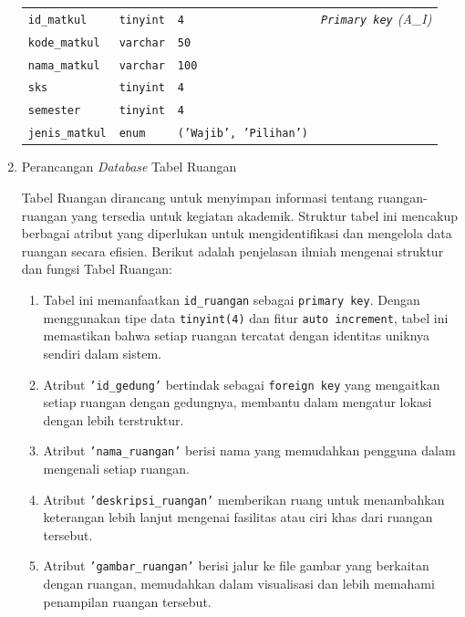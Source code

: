 \begin{enumerate}
{\begin{longtable}{p{3 cm} p{3cm} p{3 cm} p{3.4 cm}}
				      \texttt{id\_matkul}     & \texttt{tinyint}       & \texttt{4}                    & \textit{\texttt{Primary key} (A\_I)} \\
				      \texttt{kode\_matkul}   & \texttt{varchar}       & \texttt{50}                   &                                      \\
				      \texttt{nama\_matkul}   & \texttt{varchar}       & \texttt{100}                  &                                      \\
				      \texttt{sks}            & \texttt{tinyint}       & \texttt{4}                    &                                      \\
				      \texttt{semester}       & \texttt{tinyint}       & \texttt{4}                    &                                      \\
				      \texttt{jenis\_matkul}  & \texttt{enum}          & \texttt{('Wajib', 'Pilihan')} &                                      \\
				      \hline
			      \end{longtable}
		      }

	\item Perancangan \textit{Database} Tabel Ruangan

	      Tabel Ruangan dirancang untuk menyimpan informasi tentang ruangan-ruangan yang tersedia untuk kegiatan akademik. Struktur tabel ini mencakup berbagai atribut yang diperlukan untuk mengidentifikasi dan mengelola data ruangan secara efisien. Berikut adalah penjelasan ilmiah mengenai struktur dan fungsi Tabel Ruangan:

	      \begin{enumerate}[label=\alph*.]
		      \item Tabel ini memanfaatkan \texttt{id\_ruangan} sebagai \texttt{primary key}. Dengan menggunakan tipe data \texttt{tinyint(4)} dan fitur \texttt{auto increment}, tabel ini memastikan bahwa setiap ruangan tercatat dengan identitas uniknya sendiri dalam sistem.
		      \item Atribut \texttt{'id\_gedung'} bertindak sebagai \texttt{foreign key} yang mengaitkan setiap ruangan dengan gedungnya, membantu dalam mengatur lokasi dengan lebih terstruktur.
		      \item Atribut \texttt{'nama\_ruangan'} berisi nama yang memudahkan pengguna dalam mengenali setiap ruangan.
		      \item Atribut \texttt{'deskripsi\_ruangan'} memberikan ruang untuk menambahkan keterangan lebih lanjut mengenai fasilitas atau ciri khas dari ruangan tersebut.
		      \item Atribut \texttt{'gambar\_ruangan'} berisi jalur ke file gambar yang berkaitan dengan ruangan, memudahkan dalam visualisasi dan lebih memahami penampilan ruangan tersebut.
	      \end{enumerate}


\end{enumerate}
